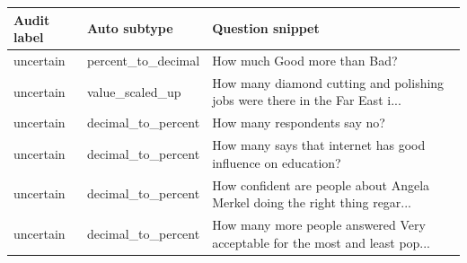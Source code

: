 \begin{tabular}{lll}
\toprule
Audit label & Auto subtype & Question snippet \\
\midrule
uncertain & percent\_to\_decimal & How much Good more than Bad? \\
uncertain & value\_scaled\_up & How many diamond cutting and polishing jobs were there in the Far East i... \\
uncertain & decimal\_to\_percent & How many respondents say no? \\
uncertain & decimal\_to\_percent & How many says that internet has good influence on education? \\
uncertain & decimal\_to\_percent & How confident are people about Angela Merkel doing the right thing regar... \\
uncertain & decimal\_to\_percent & How many more people answered Very acceptable for the most and least pop... \\
\bottomrule
\end{tabular}
